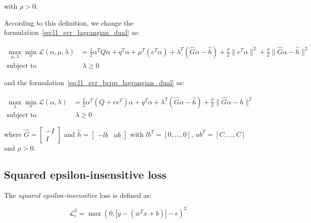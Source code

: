with $\rho > 0$.

\bigskip

According to this definition, we change the formulation~\ref{eq:l1_svr_lagrangian_dual} as:

\begin{equation} \label{eq:l1_svr_aug_lagrangian_dual}
	\begin{aligned}
		    \max_{\mu,\lambda} \min_{\alpha} \mathcal{L}(\alpha,\mu,\lambda) &= \frac{1}{2} \alpha^T Q\alpha+q^T\alpha + \mu^T (e^T \alpha) + \lambda^T (\hat{G} \alpha - \hat{h}) + \frac{\rho}{2} \| e^T \alpha \|^2 + \frac{\rho}{2} \| \hat{G} \alpha - \hat{h} \|^2 \\
    \text{subject to} \quad & \,\, \lambda \geq 0
	\end{aligned}
\end{equation}

and the formulation~\ref{eq:l1_svr_bcqp_lagrangian_dual} as:

\begin{equation} \label{eq:l1_svr_bcqp_aug_lagrangian_dual}
	\begin{aligned}
    	\max_{\lambda} \min_{\alpha} \mathcal{L}(\alpha,\lambda) &= \frac{1}{2} \alpha^T (Q + ee^T) \alpha + q^T \alpha + \lambda^T (\hat{G} \alpha - \hat{h}) + \frac{\rho}{2} \| \hat{G} \alpha - \hat{h} \|^2 \\
    \text{subject to} \quad & \,\, \lambda \geq 0
	\end{aligned}
\end{equation}

where $\hat{G} =
\begin{bmatrix}
-I \\
 I 
\end{bmatrix}$ and $\hat{h} =
\begin{bmatrix}
-lb & ub
\end{bmatrix}$ with $lb^T = [0, \dots, 0]$, $ub^T = [C, \dots, C]$ and $\rho > 0$.

\pagebreak

\subsection{Squared epsilon-insensitive loss}

The \emph{squared epsilon-insensitive} loss is defined as:

\begin{equation} \label{eq:squared_eps_loss1}
	\mathcal{L}_\epsilon^2 = \max(0, |y - (w^T x + b)| - \epsilon)^2
\end{equation}

